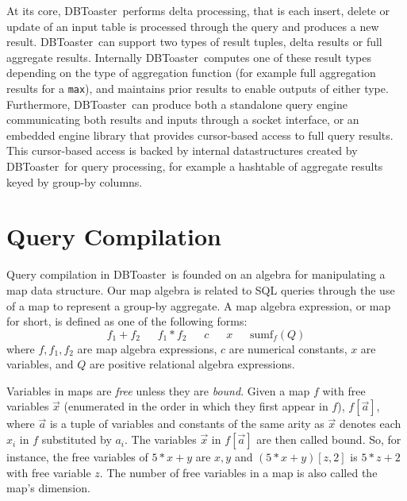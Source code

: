 \documentclass{vldb}
\newcommand{\comment}[1]{}
\newcommand{\compiler}{DBToaster}
\begin{document}
At its core, \compiler\ performs delta processing, that is each insert, delete or
update of an input table is processed through the query and produces a new
result. \compiler\ can support two types of result tuples, delta results or full
aggregate results. Internally \compiler\ computes one of these result types
depending on the type of aggregation function (for example full aggregation
results for a \texttt{max}), and maintains prior results to enable outputs of
either type. Furthermore, \compiler\ can produce both a standalone query engine
communicating both results and inputs through a socket interface, or an embedded
engine library that provides cursor-based access to full query results. This
cursor-based access is backed by internal datastructures created by \compiler\
for query processing, for example a hashtable of aggregate results keyed by
group-by columns.
\comment{
Figure~\ref{fig:demo-arch} illustrates the \compiler\ architecture.}


\section{Query Compilation}

\def\algsum{\mathrm{sum}}
\def\algagg{\mathrm{agg}}
\def\algtop{\mathrm{top}}
\def\algtopk{\mathrm{topk}}

\def\algsumr{\mbox{sumr}}
\def\algsumf{\mbox{sumf}}
\def\distinct{\mbox{distinct}}
\def\routerjoin{\bowtie\!=}

Query compilation in \compiler\ is founded on an algebra for manipulating a map
data structure. Our map algebra is related to SQL queries through the use of a
map to represent a group-by aggregate. A map algebra expression, or map for
short, is defined as one of the following forms:
\[
f_1 + f_2
\quad\;\;
f_1 * f_2
\quad\;\;
c
\quad\;\;
x
\quad\;\;
\algsumf_f(Q)
\]
where $f, f_1, f_2$ are map algebra expressions, $c$ are numerical constants,
$x$ are variables, and $Q$ are positive relational algebra
expressions.

Variables in maps are {\em free} unless they are {\em bound}. Given a map $f$
with free variables $\vec{x}$ (enumerated in the order in which they first appear
in $f$), $f[\vec{a}]$, where $\vec{a}$ is a tuple of variables and constants of
the same arity as $\vec{x}$ denotes each $x_i$ in $f$ substituted by $a_i$. The
variables $\vec{x}$ in $f[\vec{a}]$ are then called bound. So, for instance, the
free variables of $5 * x + y$ are $x,y$ and $(5 * x + y)[z, 2]$ is $5 * z + 2$
with free variable $z$. The number of free variables in a map is also called the
map's dimension.
\end{document}
